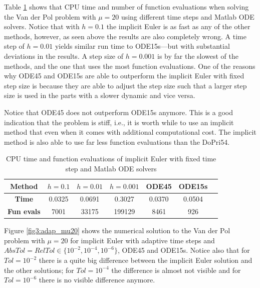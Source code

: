 Table \ref{tab3:mu20_fixed} shows that CPU time and number of function evaluations when solving the Van der Pol problem with $\mu = 20$ using different time steps and Matlab ODE solvers. Notice that with $h=0.1$ the implicit Euler is as fast as any of the other methods, however, as seen above the results are also completely wrong. A time step of $h=0.01$ yields similar run time to ODE15s---but with substantial deviations in the results. A step size of $h=0.001$ is by far the slowest of the methods, and the one that uses the most function evaluations. One of the reasons why ODE45 and ODE15s are able to outperform the implicit Euler with fixed step size is because they are able to adjust the step size such that a larger step size is used in the parts with a slower dynamic and vice versa. 

Notice that ODE45 does not outperform ODE15s anymore. This is a good indication that the problem is stiff, i.e., it is worth while to use an implicit method that even when it comes with additional computational cost. The implicit method is also able to use far less function evaluations than the DoPri54. 

\begin{table}[H]
    \centering
    \caption{CPU time and function evaluations of implicit Euler with fixed time step and Matlab ODE solvers}
    \begin{tabular}{|c||c|c|c|c|c|c|} \hline
         \textbf{Method}    & $h=0.1$&   $h=0.01$ & $h=0.001$ & ODE45 & ODE15s     \\ \hline \hline 
         \textbf{Time}      & 0.0325  &  0.0691  &  0.3027 & 0.0370 & 0.0504   \\ \hline
         \textbf{Fun evals} & 7001    &   33175   &   199129 & 8461 & 926  \\ \hline
    \end{tabular}
    \label{tab3:mu20_fixed}
\end{table}



Figure \ref{fig3:adap_mu20} shows the numerical solution to the Van der Pol problem with $\mu = 20$ for implicit Euler with adaptive time steps and $AbsTol=RelTol \in \{10^{-2}, 10^{-4}, 10^{-6}\}$, ODE45 and ODE15s. Notice also that for $Tol = 10^{-2}$ there is a quite big difference between the implicit Euler solution and the other solutions; for $Tol = 10^{-4}$ the difference is almost not visible and for $Tol = 10^{-6}$ there is no visible difference anymore.

